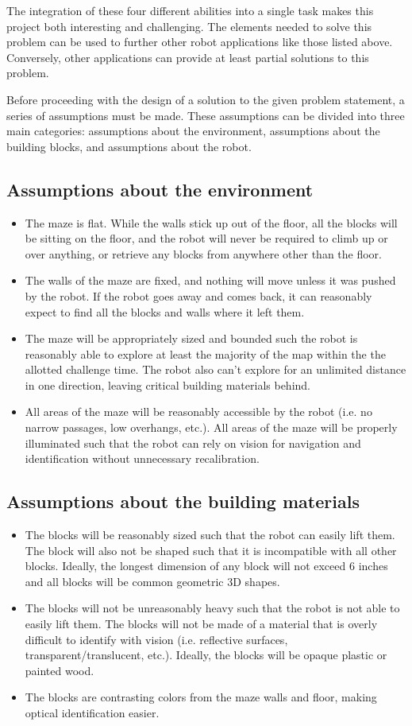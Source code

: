 \documentclass[letterpaper,11pt]{article}
\begin{document}
The integration of these four different abilities into a single task makes this project both interesting and challenging.  The elements needed to solve this problem can be used to further other robot applications like those listed above.  Conversely, other applications can provide at least partial solutions to this problem. 

Before proceeding with the design of a solution to the given problem statement, a series of assumptions must be made.  These assumptions can be divided into three main categories: assumptions about the environment, assumptions about the building blocks, and assumptions about the robot.

\subsection{Assumptions about the environment}
\begin{itemize}
 \item The maze is flat. While the walls stick up out of the floor, all the blocks will be sitting on the floor, and the robot will never be required to climb up or over anything, or retrieve any blocks from anywhere other than the floor.
 \item The walls of the maze are fixed, and nothing will move unless it was pushed by the robot. If the robot goes away and comes back, it can reasonably expect to find all the blocks and walls where it left them.
 \item The maze will be appropriately sized and bounded such the robot is reasonably able to explore at least the majority of the map within the the allotted challenge time. The robot also can't explore for an unlimited distance in one direction, leaving critical building materials behind.
 \item All areas of the maze will be reasonably accessible by the robot (i.e. no narrow passages, low overhangs, etc.).  All areas of the maze will be properly illuminated such that the robot can rely on vision for navigation and identification without unnecessary recalibration.
\end{itemize}
\subsection{Assumptions about the building materials}
\begin{itemize}
 \item The blocks will be reasonably sized such that the robot can easily lift them.  The block will also not be shaped such that it is incompatible with all other blocks. Ideally, the longest dimension of any block will not exceed 6 inches and all blocks will be common geometric 3D shapes.
 \item The blocks will not be unreasonably heavy such that the robot is not able to easily lift them.  The blocks will not be made of a material that is overly difficult to identify with vision (i.e. reflective surfaces, transparent/translucent, etc.).  Ideally, the blocks will be opaque plastic or painted wood.
 \item The blocks are contrasting colors from the maze walls and floor, making optical identification easier.
\end{itemize}
\end{document}
